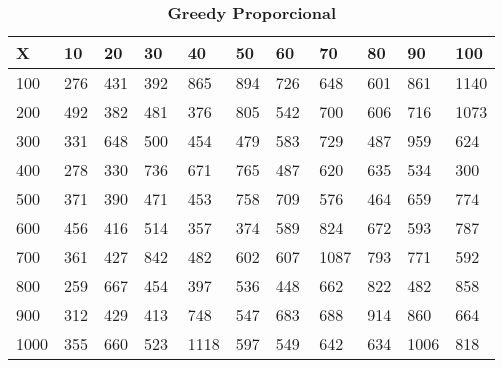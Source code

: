 \documentclass[10pt,letterpaper]{article}
\begin{document}
\begin{center}
\begin{table}\renewcommand{\arraystretch}{2.5}
\caption{\large \textbf{Greedy Proporcional}}
\centering
\begin{tabular} { |m{0.5cm}|m{1.3cm}|m{1.3cm}|m{1.3cm}|m{1.3cm}|m{1.3cm}|m{1.3cm}|m{1.3cm}|m{1.3cm}|m{1.3cm}|m{1.3cm}|} 
\hline
\rowcolor{Gray}
\centering \textbf{X} & \centering \textbf{10} & \centering \textbf{20} & \centering \textbf{30}\ & \centering \textbf{40} & \centering \textbf{50} & \centering \textbf{60}\ & \centering \textbf{70} & \centering \textbf{80} & \centering \textbf{90}\ & \textbf{100} \\\hline
\cellcolor{Gray}100 & \Large 276 & \Large 431 & \Large 392 & \Large 865 & \Large 894 & \Large 726 & \Large 648 & \Large 601 & \Large 861 & \Large 1140 \\
\hline
\cellcolor{Gray}200 & \Large 492 & \Large 382 & \Large 481 & \Large 376 & \Large 805 & \Large 542 & \Large 700 & \Large 606 & \Large 716 & \Large 1073 \\
\hline
\cellcolor{Gray}300 & \Large 331 & \Large 648 & \Large 500 & \Large 454 & \Large 479 & \Large 583 & \Large 729 & \Large 487 & \Large 959 & \Large 624 \\
\hline
\cellcolor{Gray}400 & \Large 278 & \Large 330 & \Large 736 & \Large 671 & \Large 765 & \Large 487 & \Large 620 & \Large 635 & \Large 534 & \Large 300 \\
\hline
\cellcolor{Gray}500 & \Large 371 & \Large 390 & \Large 471 & \Large 453 & \Large 758 & \Large 709 & \Large 576 & \Large 464 & \Large 659 & \Large 774 \\
\hline
\cellcolor{Gray}600 & \Large 456 & \Large 416 & \Large 514 & \Large 357 & \Large 374 & \Large 589 & \Large 824 & \Large 672 & \Large 593 & \Large 787 \\
\hline
\cellcolor{Gray}700 & \Large 361 & \Large 427 & \Large 842 & \Large 482 & \Large 602 & \Large 607 & \Large 1087 & \Large 793 & \Large 771 & \Large 592 \\
\hline
\cellcolor{Gray}800 & \Large 259 & \Large 667 & \Large 454 & \Large 397 & \Large 536 & \Large 448 & \Large 662 & \Large 822 & \Large 482 & \Large 858 \\
\hline
\cellcolor{Gray}900 & \Large 312 & \Large 429 & \Large 413 & \Large 748 & \Large 547 & \Large 683 & \Large 688 & \Large 914 & \Large 860 & \Large 664 \\
\hline
\cellcolor{Gray}1000 & \Large 355 & \Large 660 & \Large 523 & \Large 1118 & \Large 597 & \Large 549 & \Large 642 & \Large 634 & \Large 1006 & \Large 818 \\
\hline
\end{tabular} \\
\end{table}
\end{center}
\end{document}
